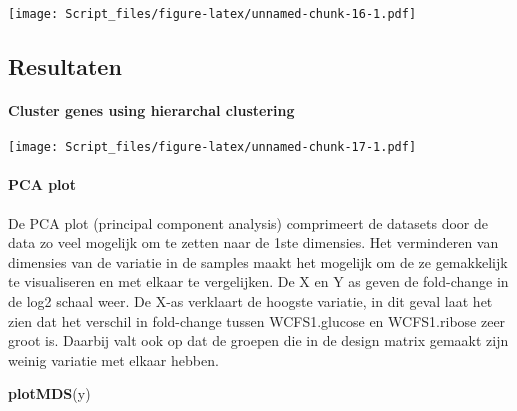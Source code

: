 \documentclass[
]{article}
\newenvironment{Shaded}{\begin{snugshade}}{\end{snugshade}}
\newcommand{\DataTypeTok}[1]{\textcolor[rgb]{0.13,0.29,0.53}{#1}}
\newcommand{\KeywordTok}[1]{\textcolor[rgb]{0.13,0.29,0.53}{\textbf{#1}}}
\newcommand{\NormalTok}[1]{#1}
\newcommand{\OperatorTok}[1]{\textcolor[rgb]{0.81,0.36,0.00}{\textbf{#1}}}
\newcommand{\StringTok}[1]{\textcolor[rgb]{0.31,0.60,0.02}{#1}}
\begin{document}
\texttt{[image: Script\_files/figure-latex/unnamed-chunk-16-1.pdf]}

\hypertarget{resultaten}{%
\subsection{Resultaten}\label{resultaten}}

\hypertarget{cluster-genes-using-hierarchal-clustering}{%
\paragraph{Cluster genes using hierarchal
clustering}\label{cluster-genes-using-hierarchal-clustering}}

\begin{Shaded}
\end{Shaded}

\texttt{[image: Script\_files/figure-latex/unnamed-chunk-17-1.pdf]}

\hypertarget{pca-plot}{%
\paragraph{PCA plot}\label{pca-plot}}

De PCA plot (principal component analysis) comprimeert de datasets door
de data zo veel mogelijk om te zetten naar de 1ste dimensies. Het
verminderen van dimensies van de variatie in de samples maakt het
mogelijk om de ze gemakkelijk te visualiseren en met elkaar te
vergelijken. De X en Y as geven de fold-change in de log2 schaal weer.
De X-as verklaart de hoogste variatie, in dit geval laat het zien dat
het verschil in fold-change tussen WCFS1.glucose en WCFS1.ribose zeer
groot is. Daarbij valt ook op dat de groepen die in de design matrix
gemaakt zijn weinig variatie met elkaar hebben.

\begin{Shaded}
\begin{Highlighting}[]
\KeywordTok{plotMDS}\NormalTok{(y)}
\end{Highlighting}
\end{Shaded}
\end{document}
